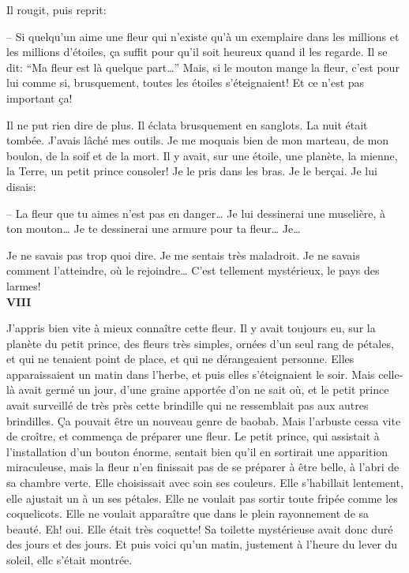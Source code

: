 \begin{Parallel}[p]{}{}
{Il rougit, puis reprit:

-- Si quelqu'un aime une fleur qui n'existe qu'à un
exemplaire dans les millions et les millions d'étoiles,
ça suffit pour qu'il soit heureux quand il les
regarde. Il se dit: ``Ma fleur est là quelque part\ldots{}''
Mais, si le mouton mange la fleur, c'est pour lui
comme si, brusquement, toutes les étoiles s'éteignaient! Et ce n'est pas important ça!

Il ne put rien dire de plus. Il éclata brusquement
en sanglots. La nuit était tombée. J'avais lâché mes
outils. Je me moquais bien de mon marteau, de mon
boulon, de la soif et de la mort. Il y avait, sur une
étoile, une planète, la mienne, la Terre, un petit
prince consoler! Je le pris dans les bras. Je le berçai. Je lui disais:

-- La fleur que tu aimes n'est pas en danger\ldots{} Je lui dessinerai une muselière, à ton mouton\ldots{} Je te dessinerai une armure pour ta fleur\ldots{} Je\ldots{}

Je ne savais pas trop quoi dire. Je me sentais
très maladroit. Je ne savais comment l'atteindre, où
le rejoindre\ldots{} C'est tellement mystérieux, le pays
des larmes!\\

\textbf{VIII}

J'appris bien vite à mieux connaître cette fleur. Il y
avait toujours eu, sur la planète du petit prince,
des fleurs très simples, ornées d'un seul rang de
pétales, et qui ne tenaient point de place, et qui ne dérangeaient personne. Elles apparaissaient un
matin dans l'herbe, et puis elles s'éteignaient le soir.
Mais celle-là avait germé un jour, d'une graine
apportée d'on ne sait où, et le petit prince avait surveillé de très près cette brindille qui ne ressemblait
pas aux autres brindilles. Ça pouvait être un nouveau genre de baobab. Mais l'arbuste cessa vite de
croître, et commença de préparer une fleur. Le petit
prince, qui assistait à l'installation d'un bouton
énorme, sentait bien qu'il en sortirait une apparition miraculeuse, mais la fleur n'en finissait pas de
se préparer à être belle, à l'abri de sa chambre verte.
Elle choisissait avec soin ses couleurs. Elle s'habillait
lentement, elle ajustait un à un ses pétales. Elle ne
voulait pas sortir toute fripée comme les coquelicots.
Elle ne voulait apparaître que dans le plein rayonnement de sa beauté. Eh! oui. Elle était très coquette!
Sa toilette mystérieuse avait donc duré des jours et
des jours. Et puis voici qu'un matin, justement à
l'heure du lever du soleil, ellc s'était montrée.

}
\end{Parallel}
